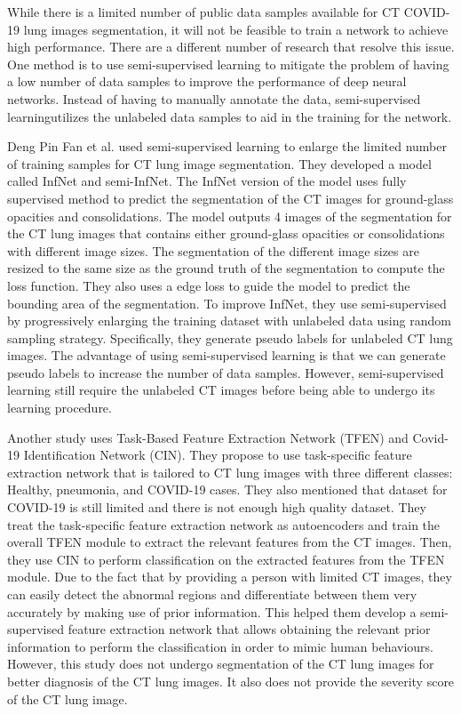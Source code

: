 While there is a limited number of public data samples available for CT COVID-19 lung images segmentation, it will not be feasible to train a network to achieve high performance. There are a different number of research that resolve this issue. One method is to use semi-supervised learning to mitigate the problem of having a low number of data samples to improve the performance of deep neural networks. Instead of having to manually annotate the data, semi-supervised learningutilizes the unlabeled data samples to aid in the training for the network.

Deng Pin Fan et al. \cite{ref14} used semi-supervised learning to enlarge the limited number of training samples for CT lung image segmentation. They developed a model called InfNet and semi-InfNet. The InfNet version of the model uses fully supervised method to predict the segmentation of the CT images for ground-glass opacities and consolidations. The model outputs 4 images of the segmentation for the CT lung images that contains either ground-glass opacities or consolidations with different image sizes. The segmentation of the different image sizes are resized to the same size as the ground truth of the segmentation to compute the loss function. They also uses a edge loss to guide the model to predict the bounding area of the segmentation. To improve InfNet, they use semi-supervised by progressively enlarging the training dataset with unlabeled data using random sampling strategy. Specifically, they generate pseudo labels for unlabeled CT lung images. The advantage of using semi-supervised learning is that we can generate pseudo labels to increase the number of data samples. However, semi-supervised learning still require the unlabeled CT images before being able to undergo its learning procedure.

Another study \cite{ref27} uses Task-Based Feature Extraction Network (TFEN) and Covid-19 Identification Network (CIN).  They propose to use task-specific feature extraction network that is tailored to CT lung images with three different classes: Healthy, pneumonia, and COVID-19 cases. They also mentioned that dataset for COVID-19 is still limited and there is not enough high quality dataset. They treat the task-specific feature extraction network as autoencoders and train the overall TFEN module to extract the relevant features from the CT images. Then, they use CIN to perform classification on the extracted features from the TFEN module. Due to the fact that by providing a person with limited CT images, they can easily detect the abnormal regions and differentiate between them very accurately by making use of prior information. This helped them develop a semi-supervised feature extraction network that allows obtaining the relevant prior information to perform the classification in order to mimic human behaviours. However, this study does not undergo segmentation of the CT lung images for better diagnosis of the CT lung images. It also does not provide the severity score of the CT lung image.

